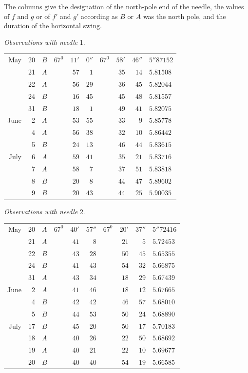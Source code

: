 The columns give the designation of the north-pole end of the needle, the values of $f$ and $g$ or of $f'$ and $g'$ according as $B$ or $A$ was the north pole, and the duration of the horizontal swing.

\begin{center}
\textit{Observations with needle} 1.

\begin{tabular}{rr|c|rrr|rrr|l}
May&20&$B$&$67^0$&$11'$&$0''$&$67^0$&$58'$&$46''$&$5''87152$\\
&21&$A$&&$57$&$1$&&$35$&$14$&$5.81508$\\
&22&$A$&&$56$&$29$&&$36$&$45$&$5.82044$\\
&24&$B$&&$16$&$45$&&$45$&$48$&$5.81557$\\
&31&$B$&&$18$&$1$&&$49$&$41$&$5.82075$\\
June&2&$A$&&$53$&$55$&&$33$&$9$&$5.85778$\\
&4&$A$&&$56$&$38$&&$32$&$10$&$5.86442$\\
&5&$B$&&$24$&$13$&&$46$&$44$&$5.83615$\\
July&6&$A$&&$59$&$41$&&$35$&$21$&$5.83716$\\
&7&$A$&&$58$&$7$&&$37$&$51$&$5.83818$\\
&8&$B$&&$20$&$8$&&$44$&$47$&$5.89602$\\
&9&$B$&&$20$&$43$&&$44$&$25$&$5.90035$
\end{tabular}
\end{center}

\begin{center}
\textit{Observations with needle} 2.

\begin{tabular}{rr|c|rrr|rrr|l}
May&20&$A$&$67^0$&$40'$&$57''$&$67^0$&$20'$&$37''$&$5''72416$\\
&21&$A$&&$41$&$8$&&$21$&$5$&$5.72453$\\
&22&$B$&&$43$&$28$&&$50$&$45$&$5.65355$\\
&24&$B$&&$41$&$43$&&$54$&$32$&$5.66875$\\
&31&$A$&&$43$&$34$&&$18$&$29$&$5.67439$\\
June&2&$A$&&$41$&$46$&&$18$&$12$&$5.67665$\\
&4&$B$&&$42$&$42$&&$46$&$57$&$5.68010$\\
&5&$B$&&$44$&$53$&&$50$&$24$&$5.68890$\\
July&17&$B$&&$45$&$20$&&$50$&$17$&$5.70183$\\
&18&$A$&&$40$&$26$&&$22$&$50$&$5.68692$\\
&19&$A$&&$40$&$21$&&$22$&$10$&$5.69677$\\
&20&$B$&&$40$&$40$&&$54$&$19$&$5.66585$
\end{tabular}
\end{center}

